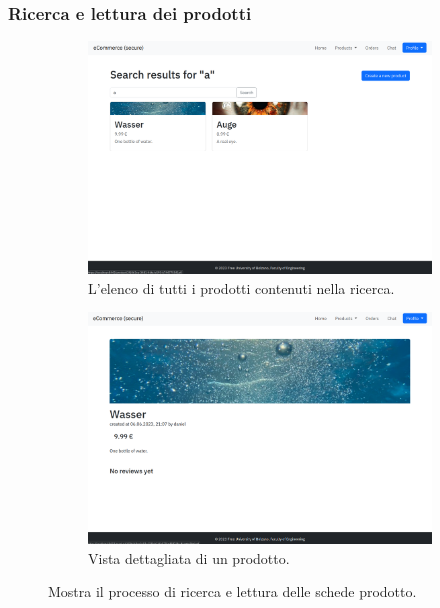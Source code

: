 \documentclass[conference,onecolumn,a4paper]{IEEEtran}
\begin{document}
\subsubsection{Ricerca e lettura dei prodotti}

\begin{figure}[H]
    \centering
    \begin{subfigure}[b]{0.4\linewidth}
        \includegraphics[width=\linewidth]{resources/seach-product.png}
        \caption{L'elenco di tutti i prodotti contenuti nella ricerca.}
    \end{subfigure}
    \begin{subfigure}[b]{0.4\linewidth}
        \includegraphics[width=\linewidth]{resources/product.png}
        \caption{Vista dettagliata di un prodotto.}
    \end{subfigure}
    \caption{Mostra il processo di ricerca e lettura delle schede prodotto.}
\end{figure}
\end{document}
